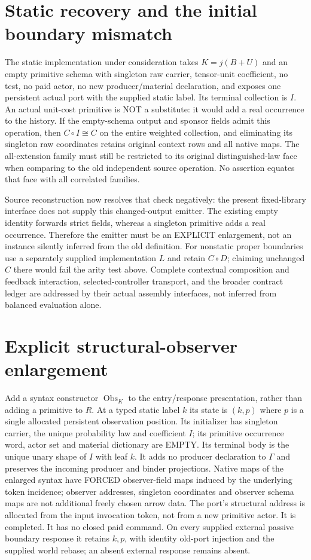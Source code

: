 \documentclass{article}
\begin{document}
\section{Static recovery and the initial boundary mismatch}
The static implementation under consideration takes $K=j(B+U)$ and an empty primitive schema with singleton raw carrier, tensor-unit coefficient, no test, no paid actor, no new producer/material declaration, and exposes one persistent actual port with the supplied static label. Its terminal collection is $I$. An actual unit-cost primitive is NOT a substitute: it would add a real occurrence to the history. If the empty-schema output and sponsor fields admit this operation, then $C\circ I\cong C$ on the entire weighted collection, and eliminating its singleton raw coordinates retains original context rows and all native maps. The all-extension family must still be restricted to its original distinguished-law face when comparing to the old independent source operation. No assertion equates that face with all correlated families.

Source reconstruction now resolves that check negatively: the present fixed-library interface does not supply this changed-output emitter. The existing empty identity forwards strict fields, whereas a singleton primitive adds a real occurrence. Therefore the emitter must be an EXPLICIT enlargement, not an instance silently inferred from the old definition. For nonstatic proper boundaries use a separately supplied implementation $L$ and retain $C\circ D$; claiming unchanged $C$ there would fail the arity test above. Complete contextual composition and feedback interaction, selected-controller transport, and the broader contract ledger are addressed by their actual assembly interfaces, not inferred from balanced evaluation alone.

\section{Explicit structural-observer enlargement}
Add a syntax constructor $\operatorname{Obs}_K$ to the entry/response presentation, rather than adding a primitive to $R$. At a typed static label $k$ its state is $(k,p)$ where $p$ is a single allocated persistent observation position. Its initializer has singleton carrier, the unique probability law and coefficient $I$; its primitive occurrence word, actor set and material dictionary are EMPTY. Its terminal body is the unique unary shape of $I$ with leaf $k$. It adds no producer declaration to $\Gamma$ and preserves the incoming producer and binder projections. Native maps of the enlarged syntax have FORCED observer-field maps induced by the underlying token incidence; observer addresses, singleton coordinates and observer schema maps are not additional freely chosen arrow data. The port's structural address is allocated from the input invocation token, not from a new primitive actor. It is completed. It has no closed paid command. On every supplied external passive boundary response it retains $k,p$, with identity old-port injection and the supplied world rebase; an absent external response remains absent.
\end{document}
